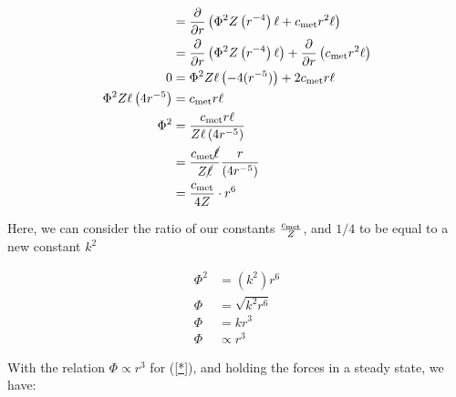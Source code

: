 \begin{enumerate}
       \begin{align*}
       &= 
       \frac{\partial }{\partial r} 
       \left(
       \Phi^{2}
       Z
       \left(
       r^{-4}
       \right)
       \ell
       +
       c_{\textnormal{met}}
       r^{2}
       \ell
       \right)
       \\
       &= 
       \frac{\partial }{\partial r} 
       \left(
       \Phi^{2}
       Z
       \left(
       r^{-4}
       \right)
       \ell
       \right)
       +
       \frac{\partial }{\partial r} 
       \left(
       c_{\textnormal{met}}
       r^{2}
       \ell
       \right)
       \\
       0 &= 
       \Phi^{2}
       Z
       \ell
       \left(
       -4
       (r^{-5})
       \right)
       +
       2 c_{\textnormal{met}} r
       \ell
       \\ 
       \Phi^{2}
       Z
       \ell
       \left(
       4 
       r^{ -5}
       \right)
       &=
       c_{\textnormal{met}}
       r
       \ell
       \\
       \Phi^{2}
       &=
       \frac{
       c_{\textnormal{met}}
       r
       \ell
       }
       {
       Z
       \ell
       \left(
       4
       r^{-5}
       \right)
       }
       \\
       &=
       \frac{
       c_{\textnormal{met}}
       \cancel{\ell}
       }
       {
       Z
       \cancel{\ell}
       }
       \frac{r}{
       \left(
       4 
       r^{-5}
       \right)}
       \\
       &=
       \frac{c_{\textnormal{met}}
       }{4 Z}
       \cdot
       r^{6}
       \end{align*}
    
       Here, we can consider the ratio of our constants
       $
       \frac{
       c_\textnormal{met}}
       {Z
       }
       $, and $1/4$ to be equal to a new constant $k^2$
       
       \begin{align*}
       \Phi^{2}
       &=
       \left(
       k^{2}
       \right)
       r^{6}
       \\
       \Phi
       &=
       \sqrt{
       k^{2}
       r^{6}
       }
       \\
       \Phi
       &=
       k
       r^3
       \\
       \Phi
       &\propto
       r^3
       \end{align*}
       
       With the relation $\Phi \propto r^3$ for (\ref{*}),
       and holding the forces in a steady state, we have:


\end{enumerate}
